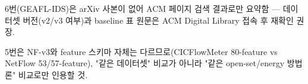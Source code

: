 \par\noindent \textbullet\enspace 6번(GEAFL-IDS)은 arXiv 사본이 없어 ACM 페이지 검색 결과로만 요약함 — 데이터셋 버전(v2/\allowbreak{}v3 여부)과 baseline 표 원문은 ACM Digital Library 접속 후 재확인 권장.


\par\noindent \textbullet\enspace 5번은 NF-v3와 feature 스키마 자체는 다르므로(CICFlowMeter 80-feature vs NetFlow 53/\allowbreak{}57-feature), "같은 데이터셋" 비교가 아니라 "같은 open-set/\allowbreak{}energy 방법론" 비교로만 인용할 것.





